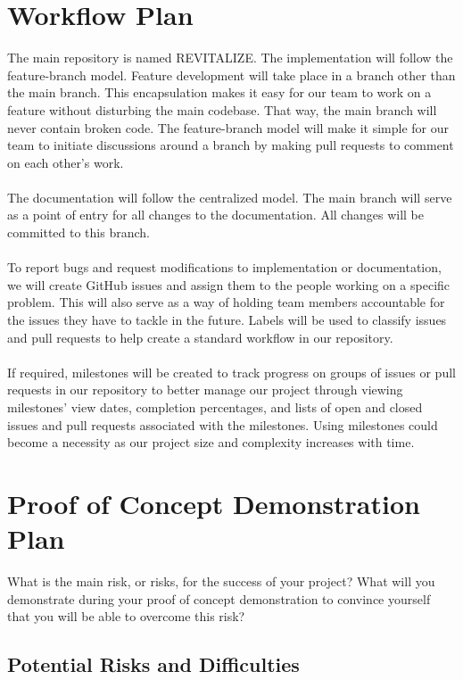 \documentclass{article}
\begin{document}
\section{Workflow Plan}
The main repository is named REVITALIZE. The implementation will follow the feature-branch model. Feature development will take place in a branch other than the main branch. This encapsulation makes it easy for our team to work on a feature without disturbing the main codebase. That way, the main branch will never contain broken code. The feature-branch model will make it simple for our team to initiate discussions around a branch by making pull requests to comment on each other’s work.\\\\
The documentation will follow the centralized model. The main branch will serve as a point of entry for all changes to the documentation. All changes will be committed to this branch.\\\\
To report bugs and request modifications to implementation or documentation, we will create GitHub issues and assign them to the people working on a specific problem. This will also serve as a way of holding team members accountable for the issues they have to tackle in the future. Labels will be used to classify issues and pull requests to help create a standard workflow in our repository.\\\\
If required, milestones will be created to track progress on groups of issues or pull requests in our repository to better manage our project through viewing milestones’ view dates, completion percentages, and lists of open and closed issues and pull requests associated with the milestones. Using milestones could become a necessity as our project size and complexity increases with time.


\section{Proof of Concept Demonstration Plan}

What is the main risk, or risks, for the success of your project?  What will you
demonstrate during your proof of concept demonstration to convince yourself that
you will be able to overcome this risk?

\subsection{Potential Risks and Difficulties}
\end{document}
